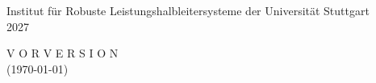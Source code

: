 \begin{titlepage}
\vspace*{12mm}
\begin{center}
	\sffamily
	\large
	Institut für Robuste Leistungshalbleitersysteme der Universität Stuttgart\\
	\vspace*{5mm}
	2027
\end{center}


{%
	\centering \large
	\vspace{1cm}
	V O R V E R S I O N\\
	(\today)
}{}
\vfill
\end{titlepage}

\cleardoubleemptypage

